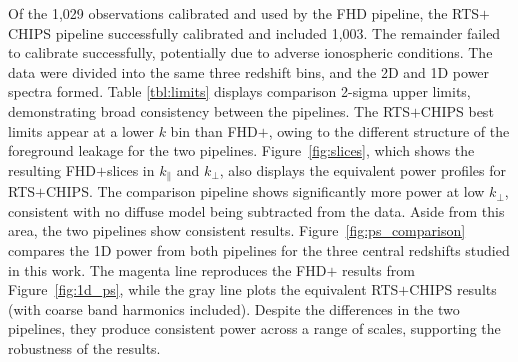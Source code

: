 \documentclass[iop]{emulateapj}
\begin{document}
Of the 1,029 observations calibrated and used by the FHD pipeline, the RTS$+$CHIPS 
pipeline successfully calibrated and included 1,003. The remainder failed to calibrate 
successfully, potentially due to adverse ionospheric conditions. The data were divided into the 
same three redshift bins, and the 2D and 1D power spectra formed. Table \ref{tbl:limits} 
displays comparison 2-sigma upper limits, demonstrating broad consistency between the 
pipelines. The RTS$+$CHIPS best limits appear at a lower $k$ bin than FHD$+$\eppsilon, 
owing to the different structure of the foreground leakage for the two pipelines. 
Figure~\ref{fig:slices}, which shows the resulting FHD$+$\eppsilon slices in $k_\parallel$ and 
$k_\bot$, also displays the equivalent power profiles for RTS$+$CHIPS. The comparison 
pipeline shows significantly more power at low $k_\bot$, consistent with no diffuse model 
being subtracted from the data. Aside from this area, the two pipelines show consistent 
results. Figure~\ref{fig:ps_comparison} compares the 1D power from both pipelines for the 
three central redshifts studied in this work. The magenta line reproduces the FHD$+$\eppsilon 
results from Figure~\ref{fig:1d_ps}, while the gray line plots the equivalent RTS$+$CHIPS 
results (with coarse band harmonics included). Despite the differences in the two pipelines, 
they produce consistent power across a range of scales, supporting the robustness of the 
results.

\end{document}
